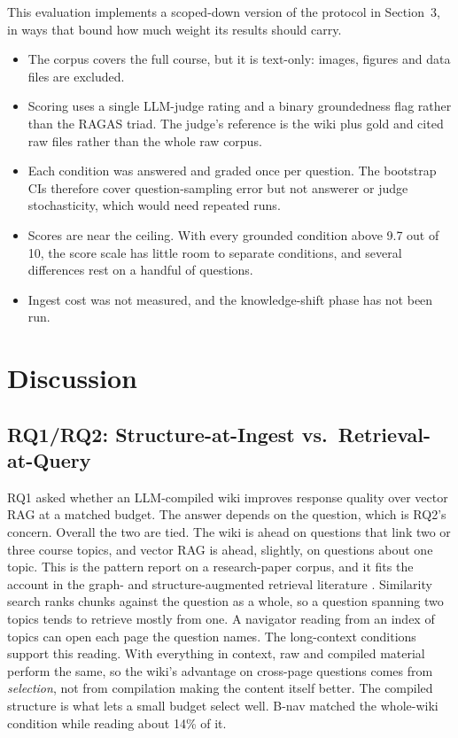 \documentclass[letterpaper]{article} %
\begin{document}
This evaluation implements a scoped-down version of the protocol in Section~3, in ways that bound how much weight its results should carry.
\begin{itemize}
\item The corpus covers the full course, but it is text-only: images, figures and data files are excluded.
\item Scoring uses a single LLM-judge rating and a binary groundedness flag rather than the RAGAS triad. The judge's reference is the wiki plus gold and cited raw files rather than the whole raw corpus.
\item Each condition was answered and graded once per question. The bootstrap CIs therefore cover question-sampling error but not answerer or judge stochasticity, which would need repeated runs.
\item Scores are near the ceiling. With every grounded condition above 9.7 out of 10, the score scale has little room to separate conditions, and several differences rest on a handful of questions.
\item Ingest cost was not measured, and the knowledge-shift phase has not been run.
\end{itemize}

\section{Discussion}

\subsection{RQ1/RQ2: Structure-at-Ingest vs.\ Retrieval-at-Query}

RQ1 asked whether an LLM-compiled wiki improves response quality over vector RAG at a matched budget. The answer depends on the question, which is RQ2's concern. Overall the two are tied. The wiki is ahead on questions that link two or three course topics, and vector RAG is ahead, slightly, on questions about one topic. This is the pattern \citet{cochran2026vector} report on a research-paper corpus, and it fits the account in the graph- and structure-augmented retrieval literature \citep{peng2024graph,aboulela2025exploring}. Similarity search ranks chunks against the question as a whole, so a question spanning two topics tends to retrieve mostly from one. A navigator reading from an index of topics can open each page the question names. The long-context conditions support this reading. With everything in context, raw and compiled material perform the same, so the wiki's advantage on cross-page questions comes from \emph{selection}, not from compilation making the content itself better. The compiled structure is what lets a small budget select well. B-nav matched the whole-wiki condition while reading about 14\% of it.
\end{document}
